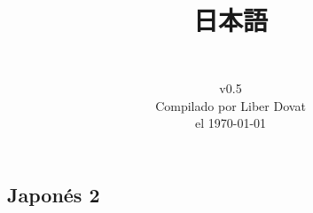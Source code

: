 \documentclass[a4paper,12pt,oneside]{report}
\begin{document}
\begin{CJK*}{UTF8}{min}%



  \title{
    \begin{flushright}
      \Huge  日本語\\
      \LARGE {}
    \end{flushright}
  } %

  \author{\vspace{7cm}\\
    v0.5\\
    Compilado por Liber Dovat\\
    el \today\\
  } %

  \date{}
  \maketitle

  \newpage


  \tableofcontents
  \thispagestyle{plain}

  \newpage




%
%
%


  \chapter{Japon\'es 2}
  \thispagestyle{contenido} %
  \pagestyle{contenido}     %


\end{CJK*}
\end{document}
